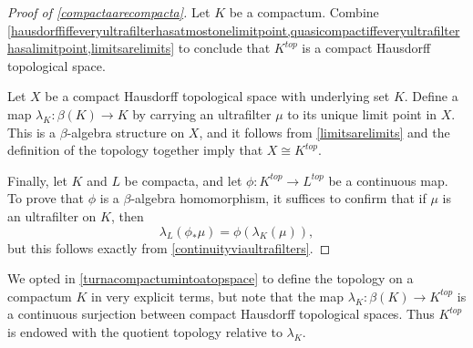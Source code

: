 \begin{proof}[Proof of \ref{compactaarecompacta}]
	Let $ K $ be a compactum.
	Combine \ref{hausdorffiffeveryultrafilterhasatmostonelimitpoint,quasicompactiffeveryultrafilterhasalimitpoint,limitsarelimits} to conclude that $ K^{\textit{top}} $ is a compact Hausdorff topological space.

	Let $ X $ be a compact Hausdorff topological space with underlying set $ K $.
	Define a map $ \lambda_K \colon \beta(K) \to K $ by carrying an ultrafilter $ \mu $ to its unique limit point in $ X $.
	This is a $ \beta $-algebra structure on $ X $, and it follows from \ref{limitsarelimits} and the definition of the topology together imply that $ X \cong K^{\textit{top}}$.

	Finally, let $ K $ and $ L $ be compacta, and let $ \phi \colon K^{\textit{top}} \to L^{\textit{top}} $ be a continuous map.
	To prove that $ \phi $ is a $ \beta $-algebra homomorphism, it suffices to confirm that if $ \mu $ is an ultrafilter on $ K $, then
	\[
		\lambda_L (\phi_{\ast} \mu) = \phi (\lambda_K(\mu)) \comma
	\]
	but this follows exactly from \ref{continuityviaultrafilters}.
\end{proof}

\begin{nul}
	We opted in \ref{turnacompactumintoatopspace} to define the topology on a compactum $ K $ in very explicit terms, but note that the map $ \lambda_K \colon \beta(K) \to K^{\textit{top}} $ is a continuous surjection between compact Hausdorff topological spaces.
	Thus $ K^{\textit{top}} $ is endowed with the quotient topology relative to $ \lambda_K $.
\end{nul}


